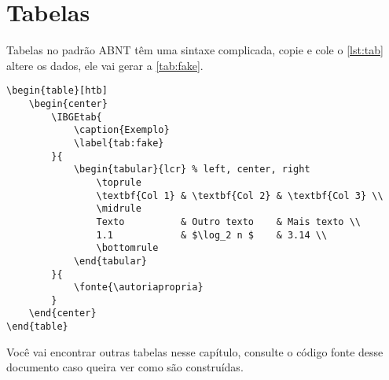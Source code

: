 \section{Tabelas}

Tabelas no padrão ABNT têm uma sintaxe complicada, copie e cole o \autoref{lst:tab} altere os dados, ele vai gerar a \autoref{tab:fake}.

\begin{lstlisting}[float=htb, style=latexStyle, caption={Tabela}, label=lst:tab]
\begin{table}[htb]
	\begin{center}
		\IBGEtab{
			\caption{Exemplo}
			\label{tab:fake}
		}{
			\begin{tabular}{lcr} % left, center, right
				\toprule
				\textbf{Col 1} & \textbf{Col 2} & \textbf{Col 3} \\
				\midrule
				Texto          & Outro texto    & Mais texto \\
				1.1            & $\log_2 n $    & 3.14 \\
				\bottomrule
			\end{tabular}
		}{
			\fonte{\autoriapropria}
		}
	\end{center}
\end{table}
\end{lstlisting}

\begin{table}[htb]
	\begin{center}
	\end{center}
\end{table}

Você vai encontrar outras tabelas nesse capítulo, consulte o código fonte desse documento caso queira ver como são construídas.

